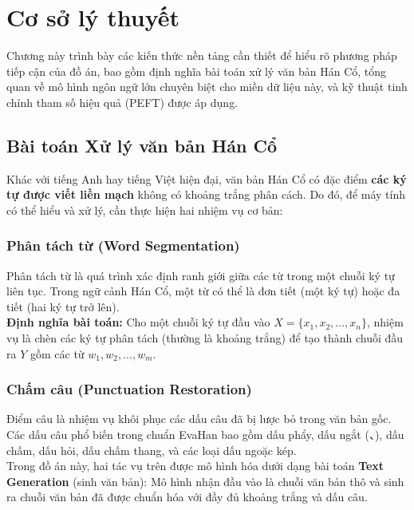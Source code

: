 \chapter{Cơ sở lý thuyết}
\label{chap:background}

Chương này trình bày các kiến thức nền tảng cần thiết để hiểu rõ phương pháp tiếp cận của đồ án, bao gồm định nghĩa bài toán xử lý văn bản Hán Cổ, tổng quan về mô hình ngôn ngữ lớn chuyên biệt cho miền dữ liệu này, và kỹ thuật tinh chỉnh tham số hiệu quả (PEFT) được áp dụng.

\section{Bài toán Xử lý văn bản Hán Cổ}

Khác với tiếng Anh hay tiếng Việt hiện đại, văn bản Hán Cổ có đặc điểm \textbf{các ký tự được viết liền mạch} không có khoảng trắng phân cách. Do đó, để máy tính có thể hiểu và xử lý, cần thực hiện hai nhiệm vụ cơ bản:

\subsection{Phân tách từ (Word Segmentation)}
Phân tách từ là quá trình xác định ranh giới giữa các từ trong một chuỗi ký tự liên tục. Trong ngữ cảnh Hán Cổ, một từ có thể là đơn tiết (một ký tự) hoặc đa tiết (hai ký tự trở lên).
\\
\textbf{Định nghĩa bài toán:} Cho một chuỗi ký tự đầu vào $X = \{x_1, x_2, ..., x_n\}$, nhiệm vụ là chèn các ký tự phân tách (thường là khoảng trắng) để tạo thành chuỗi đầu ra $Y$ gồm các từ $w_1, w_2, ..., w_m$.

\subsection{Chấm câu (Punctuation Restoration)}
Điểm câu là nhiệm vụ khôi phục các dấu câu đã bị lược bỏ trong văn bản gốc. Các dấu câu phổ biến trong chuẩn EvaHan bao gồm dấu phẩy, dấu ngắt (、), dấu chấm, dấu hỏi, dấu chấm thang, và các loại dấu ngoặc kép.
\\
Trong đồ án này, hai tác vụ trên được mô hình hóa dưới dạng bài toán \textbf{Text Generation} (sinh văn bản): Mô hình nhận đầu vào là chuỗi văn bản thô và sinh ra chuỗi văn bản đã được chuẩn hóa với đầy đủ khoảng trắng và dấu câu.

